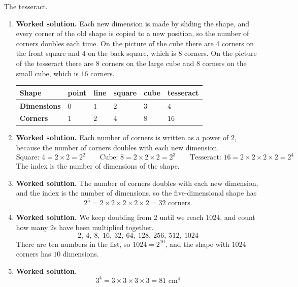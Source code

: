 \documentclass[12pt,a4paper]{article}
\newcommand{\qhead}[2]{\par\addvspace{9pt}%
  \noindent{\bfseries Q#1.}\enspace #2\par\nobreak}
\newcommand{\wsol}{\par\smallskip
  \noindent\textbf{\color{blue!50!black}Worked solution.}\space}
\begin{document}
\newpage

\qhead{15}{The tesseract.}
\begin{enumerate}
\item
\wsol
Each new dimension is made by sliding the shape, and every corner of the old
shape is copied to a new position, so the number of corners doubles each time.
On the picture of the cube there are $4$ corners on the front square and $4$ on
the back square, which is $8$ corners. On the picture of the tesseract there
are $8$ corners on the large cube and $8$ corners on the small cube, which is
$16$ corners.

\vspace{2pt}
\begin{center}
\renewcommand{\arraystretch}{1.5}
\begin{tabular}{|l|>{\centering\arraybackslash}p{1.8cm}
  |>{\centering\arraybackslash}p{1.8cm}|>{\centering\arraybackslash}p{1.9cm}
  |>{\centering\arraybackslash}p{1.9cm}|>{\centering\arraybackslash}p{2.2cm}|}
\hline
\textbf{Shape} & point & line & square & cube & tesseract\\ \hline
\textbf{Dimensions} & $0$ & $1$ & $2$ & $3$ & $4$\\ \hline
\textbf{Corners} & $1$ & $2$ & $4$ & $8$ & $16$\\ \hline
\end{tabular}
\end{center}

\item
\wsol
Each number of corners is written as a power of $2$, because the number of
corners doubles with each new dimension.
\[\text{Square: }4=2\times2=2^2\qquad
  \text{Cube: }8=2\times2\times2=2^3\qquad
  \text{Tesseract: }16=2\times2\times2\times2=2^4\]
The index is the number of dimensions of the shape.

\item
\wsol
The number of corners doubles with each new dimension, and the index is the
number of dimensions, so the five-dimensional shape has
\[2^5=2\times2\times2\times2\times2=32\text{ corners.}\]

\item
\wsol
We keep doubling from $2$ until we reach $1024$, and count how many $2$s have
been multiplied together.
\[2,\ 4,\ 8,\ 16,\ 32,\ 64,\ 128,\ 256,\ 512,\ 1024\]
There are ten numbers in the list, so $1024=2^{10}$, and the shape with $1024$
corners has $10$ dimensions.

\item
\wsol
\[3^4=3\times3\times3\times3=81\text{ cm}^4\]


\end{enumerate}
\end{document}
